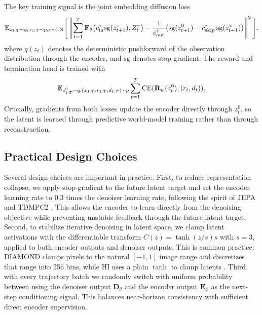 \documentclass{article}
\newcommand{\E}{\mathbb{E}}
\begin{document}
The key training signal is the joint embedding diffusion loss
{\setlength{\abovedisplayskip}{4pt}%
 \setlength{\belowdisplayskip}{6pt}%
 \setlength{\abovedisplayshortskip}{0pt}%
 \setlength{\belowdisplayshortskip}{0pt}%
\begin{equation}
\begin{split}
\E_{z_{1:T} \sim q, x_{1:T}\sim p, \tau \sim \textnormal{LN}}\Bigg[
\left\| \sum_{t=1}^{T}
\mathbf{F}_{\theta}\bigl(c_{\mathrm{in}}^\tau \mathrm{sg}(z_{t+1}^\tau), Z_t^\tau\bigr)
-
\frac{1}{c_{\mathrm{out}}^\tau}\bigl(\mathrm{sg}(z_{t+1}^0) - c_{\mathrm{skip}}^\tau\, \mathrm{sg}(z_{t+1}^\tau) \bigr)
\right\|^2
\Bigg].
\end{split}
\label{eqn:jedi_dyn_loss}
\end{equation}
}
where $q(z_t)$ denotes the deterministic pushforward of the observation distribution through the encoder, and $\mathrm{sg}$ denotes stop-gradient.
The reward and termination head is trained with
{\setlength{\abovedisplayskip}{4pt}%
 \setlength{\belowdisplayskip}{4pt}%
 \setlength{\abovedisplayshortskip}{0pt}%
 \setlength{\belowdisplayshortskip}{0pt}%
\begin{equation}
\begin{split}
\E_{z_{1:T}^0 \sim q, (x_{1:T},r_{1:T},d_{1:T}) \sim p}
\sum_{t=1}^T \textnormal{CE}(\mathbf{R_\psi}(z_t^0), (r_t,d_t)).
\label{eqn:jedi_rew_loss}
\end{split}
\end{equation}
}
Crucially, gradients from both losses update the encoder directly through $z_t^0$, so the latent is learned through predictive world-model training rather than through reconstruction.

\subsection{Practical Design Choices}
Several design choices are important in practice. First, to reduce representation collapse, we apply stop-gradient to the future latent target and set the encoder learning rate to 0.3 times the denoiser learning rate, following the spirit of JEPA and TDMPC2 \citep{assran2023I-JEPA,hansen2023tdmpc2}. This allows the encoder to learn directly from the denoising objective while preventing unstable feedback through the future latent target. Second, to stabilize iterative denoising in latent space, we clamp latent activations with the differentiable transform $C(z)=\tanh(z/s)s$ with $s=3$, applied to both encoder outputs and denoiser outputs. This is common practice: DIAMOND clamps pixels to the natural $[-1,1]$ image range and discretizes that range into 256 bins, while HI uses a plain $\tanh$ to clamp latents \citep{alonso2024diamond,cohen2026horizonImagination}. Third, with every trajectory batch we randomly switch with uniform probability between using the denoiser output $\mathbf{D}_{\theta}$ and the encoder output $\mathbf{E}_{\phi}$ as the next-step conditioning signal. This balances near-horizon consistency with sufficient direct encoder supervision.
\end{document}
